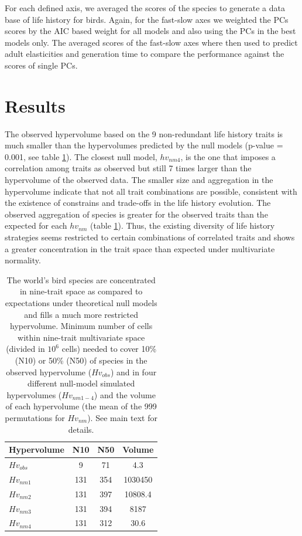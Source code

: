 For each defined axis, we averaged the scores of the species to generate a data 
base of life history for birds. Again, for the fast-slow axes we weighted the
PCs scores by the AIC based weight for all models and also using the PCs in the
best models only. The averaged scores of the fast-slow axes where then used to
predict adult elasticities and generation time to compare the performance
against the scores of single PCs.


\section{Results}

The observed hypervolume based on the 9 non-redundant life history traits is 
much smaller than the hypervolumes predicted by the null models (p-value = 
0.001, see table \ref{tab:table2.2}). The closest null model, $hv_{nm4}$, is 
the one that imposes a correlation among traits as observed but still 7 times 
larger than the hypervolume of the observed data. The smaller size and 
aggregation in the hypervolume indicate that not all trait combinations are 
possible, consistent with the existence of constrains and trade-offs in the life 
history evolution. The observed aggregation of species is greater for the 
observed traits than the expected for each $hv_{nm}$ (table 
\ref{tab:table2.2}). Thus, the existing diversity of life history strategies 
seems restricted to certain combinations of correlated traits and shows a 
greater concentration in the trait space than expected under multivariate 
normality.

\begin{table}
\center
\caption[Species' concentration and hypervolumes]{The world's bird species are
concentrated in nine-trait space as compared to expectations under theoretical
null models and fills a much more restricted hypervolume. Minimum number of 
cells within nine-trait multivariate space (divided in $10^{6}$ cells) needed to
cover 10\% (N10) or 50\% (N50) of species in the observed hypervolume 
($Hv_{obs}$) and in four different null-model simulated hypervolumes 
($Hv_{nm1-4}$) and the volume of each hypervolume (the mean of the 999 
permutations for $Hv_{nm}$). See main text for details.}
\label{tab:table2.2}
\begin{tabular}[b]{@{}lccc@{}}
\toprule
\textbf{Hypervolume} & \textbf{N10} & \textbf{N50} & \textbf{Volume} \\
\midrule
$Hv_{obs}$  & 9   & 71  & 4.3 \\
$Hv_{nm1}$  & 131 & 354 & 1030450 \\
$Hv_{nm2}$  & 131 & 397 & 10808.4 \\
$Hv_{nm3}$  & 131 & 394 & 8187 \\
$Hv_{nm4}$  & 131 & 312 & 30.6 \\
\bottomrule
\end{tabular}
\end{table}

